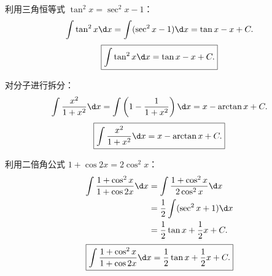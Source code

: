 \begin{solution}

    利用三角恒等式 $\tan^2 x = \sec^2 x - 1$：
    \begin{equation}
        \int \tan^2 x \d x = \int (\sec^2 x - 1) \d x = \tan x - x + C.
    \end{equation}
    \begin{equation}
        \boxed{\int \tan^2 x \d x = \tan x - x + C.}
    \end{equation}


    对分子进行拆分：
    \begin{equation}
        \int \frac{x^2}{1 + x^2} \d x = \int \left( 1 - \frac{1}{1 + x^2} \right) \d x = x - \arctan x + C.
    \end{equation}
    \begin{equation}
        \boxed{\int \frac{x^2}{1 + x^2} \d x = x - \arctan x + C.}
    \end{equation}


    利用二倍角公式 $1 + \cos 2x = 2\cos^2 x$：
    \begin{equation}
        \begin{aligned}
            \int \frac{1 + \cos^2 x}{1 + \cos 2x} \d x & = \int \frac{1 + \cos^2 x}{2\cos^2 x} \d x \\
                                                       & = \frac{1}{2} \int (\sec^2 x + 1) \d x     \\
                                                       & = \frac{1}{2}\tan x + \frac{1}{2}x + C.
        \end{aligned}
    \end{equation}
    \begin{equation}
        \boxed{\int \frac{1 + \cos^2 x}{1 + \cos 2x} \d x = \frac{1}{2}\tan x + \frac{1}{2}x + C.}
    \end{equation}
\end{solution}

